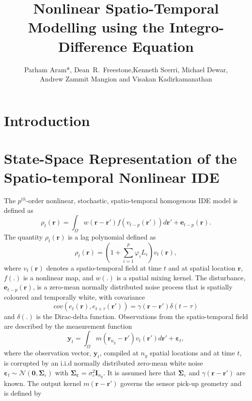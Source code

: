 \documentclass[a4paper,10pt]{article}
\title{Nonlinear Spatio-Temporal Modelling using the Integro-Difference Equation}
\author{Parham Aram*,
        Dean~R.~Freestone,Kenneth Scerri, Michael Dewar,\\ Andrew Zammit Mangion and Visakan Kadirkamanathan}
\begin{document}
\maketitle

\begin{abstract}

\end{abstract}

\section{Introduction}
\section{State-Space Representation of the Spatio-temporal Nonlinear IDE}
The $p^{th}$-order nonlinear, stochastic, spatio-temporal homogenous IDE model is defined as
 \begin{equation}\label{eq:IDEModel}
  \rho_t(\mathbf r)=\int_{\Omega}w(\mathbf r-\mathbf r')f(v_{t-p}(\mathbf r'))d\mathbf r'+\mathbf e_{t-p}(\mathbf r). 
 \end{equation}
The quantity $\rho_t(\mathbf r)$ is a lag polynomial defined as
\begin{equation}\label{eq:LagPolynomial}
 \rho_t(\mathbf r)=(1+\sum_{i=1}^{p}\varphi_i L_i)v_{t}\left(\mathbf r\right),
\end{equation}
where $v_t(\mathbf r)$ denotes a spatio-temporal field at time $t$ and at spatial location $\mathbf r$, $f(.)$ is a nonlinear map, and $w(.)$ is a spatial mixing kernel. The disturbance, $\mathbf e_{t-p}(\mathbf r)$, is a zero-mean normally distributed noise process that is spatially
coloured and temporally white, with covariance
\begin{equation}
cov\left(e_{t}\left(\mathbf{r}\right),e_{t+\tau}\left(\mathbf{r'}\right)\right)=
\gamma\left(\mathbf{r}-\mathbf{r'}\right)\delta(t-\tau)
\label{eq:FieldCovariance}
\end{equation}
and $\delta(.)$ is the Dirac-delta function.
Observations from the spatio-temporal field are described by the measurement function
\begin{equation}
    \label{eq:ObservationEquation}
	\mathbf{y}_t =
	\int_{\Omega}{
	    m\left(\mathbf{r}_{n_y}-\mathbf{r}'\right)v_t\left(\mathbf{r}'\right)
	d\mathbf{r}'} + 
	\boldsymbol{\varepsilon}_t, 
\end{equation}
where the observation vector, $\mathbf{y}_{t}$, compiled at $n_{y}$ spatial locations and at time $t$, is corrupted by an i.i.d normally distributed zero-mean white noise ${\boldsymbol\varepsilon}_t\sim \mathcal{N}\left(\mathbf{0},\boldsymbol\Sigma_{\varepsilon}\right)$ with $\mathbf{\Sigma}_{\boldsymbol\varepsilon}=\sigma_{\varepsilon}^2\mathbf I_{n_y} $. It is assumed here that $\boldsymbol\Sigma_{\varepsilon}$ and $\gamma\left(\mathbf r-\mathbf r' \right)$ are known. The output kernel $m(\mathbf{r}-\mathbf{r}')$ governs the sensor pick-up geometry and is defined by 
\end{document}
